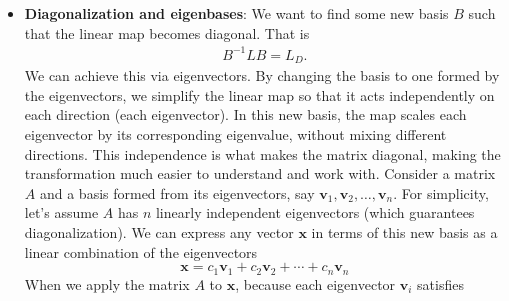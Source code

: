 \documentclass{report}
\begin{document}
\begin{itemize}
        \item \textbf{Diagonalization and eigenbases}: We want to find some new basis $B$ such that the linear map becomes diagonal. That is
            \begin{align*}
                B^{-1}LB = L_{D}
            .\end{align*}
            \bigbreak \noindent 
            We can achieve this via eigenvectors. By changing the basis to one formed by the eigenvectors, we simplify the linear map so that it acts independently on each direction (each eigenvector). In this new basis, the map scales each eigenvector by its corresponding eigenvalue, without mixing different directions. This independence is what makes the matrix diagonal, making the transformation much easier to understand and work with.
            \bigbreak \noindent 
            Consider a matrix \( A \) and a basis formed from its eigenvectors, say 
            \( \mathbf{v}_1, \mathbf{v}_2, \dots, \mathbf{v}_n \). For simplicity, let’s assume \( A \) has \( n \) linearly 
            independent eigenvectors (which guarantees diagonalization).
            \bigbreak \noindent 
            We can express any vector \( \mathbf{x} \) in terms of this new basis as a linear combination of the eigenvectors
            \[
                \mathbf{x} = c_1 \mathbf{v}_1 + c_2 \mathbf{v}_2 + \cdots + c_n \mathbf{v}_n
            \]
            When we apply the matrix \( A \) to \( \mathbf{x} \), because each eigenvector \( \mathbf{v}_i \) satisfies 

\end{itemize}
\end{document}
